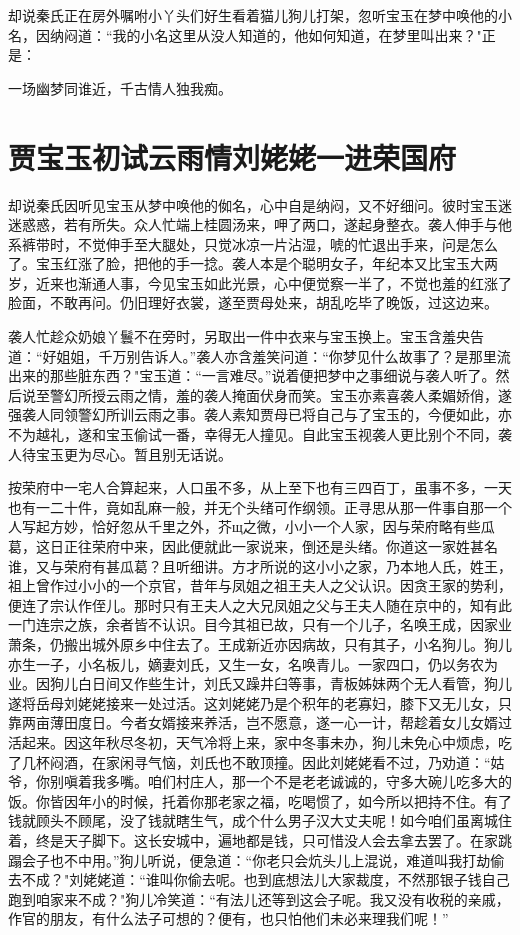 却说秦氏正在房外嘱咐小丫头们好生看着猫儿狗儿打架，忽听宝玉在梦中唤他的小名，因纳闷道：“我的小名这里从没人知道的，他如何知道，在梦里叫出来？"正是：

一场幽梦同谁近，千古情人独我痴。

\chapter{贾宝玉初试云雨情\ttlbreak 刘姥姥一进荣国府}

却说秦氏因听见宝玉从梦中唤他的侞名，心中自是纳闷，又不好细问。彼时宝玉迷迷惑惑，若有所失。众人忙端上桂圆汤来，呷了两口，遂起身整衣。袭人伸手与他系裤带时，不觉伸手至大腿处，只觉冰凉一片沾湿，唬的忙退出手来，问是怎么了。宝玉红涨了脸，把他的手一捻。袭人本是个聪明女子，年纪本又比宝玉大两岁，近来也渐通人事，今见宝玉如此光景，心中便觉察一半了，不觉也羞的红涨了脸面，不敢再问。仍旧理好衣裳，遂至贾母处来，胡乱吃毕了晚饭，过这边来。

袭人忙趁众奶娘丫鬟不在旁时，另取出一件中衣来与宝玉换上。宝玉含羞央告道：“好姐姐，千万别告诉人。”袭人亦含羞笑问道：“你梦见什么故事了？是那里流出来的那些脏东西？"宝玉道：“一言难尽。”说着便把梦中之事细说与袭人听了。然后说至警幻所授云雨之情，羞的袭人掩面伏身而笑。宝玉亦素喜袭人柔媚娇俏，遂强袭人同领警幻所训云雨之事。袭人素知贾母已将自己与了宝玉的，今便如此，亦不为越礼，遂和宝玉偷试一番，幸得无人撞见。自此宝玉视袭人更比别个不同，袭人待宝玉更为尽心。暂且别无话说。

按荣府中一宅人合算起来，人口虽不多，从上至下也有三四百丁，虽事不多，一天也有一二十件，竟如乱麻一般，并无个头绪可作纲领。正寻思从那一件事自那一个人写起方妙，恰好忽从千里之外，芥щ之微，小小一个人家，因与荣府略有些瓜葛，这日正往荣府中来，因此便就此一家说来，倒还是头绪。你道这一家姓甚名谁，又与荣府有甚瓜葛？且听细讲。方才所说的这小小之家，乃本地人氏，姓王，祖上曾作过小小的一个京官，昔年与凤姐之祖王夫人之父认识。因贪王家的势利，便连了宗认作侄儿。那时只有王夫人之大兄凤姐之父与王夫人随在京中的，知有此一门连宗之族，余者皆不认识。目今其祖已故，只有一个儿子，名唤王成，因家业萧条，仍搬出城外原乡中住去了。王成新近亦因病故，只有其子，小名狗儿。狗儿亦生一子，小名板儿，嫡妻刘氏，又生一女，名唤青儿。一家四口，仍以务农为业。因狗儿白日间又作些生计，刘氏又躁井臼等事，青板姊妹两个无人看管，狗儿遂将岳母刘姥姥接来一处过活。这刘姥姥乃是个积年的老寡妇，膝下又无儿女，只靠两亩薄田度日。今者女婿接来养活，岂不愿意，遂一心一计，帮趁着女儿女婿过活起来。因这年秋尽冬初，天气冷将上来，家中冬事未办，狗儿未免心中烦虑，吃了几杯闷酒，在家闲寻气恼，刘氏也不敢顶撞。因此刘姥姥看不过，乃劝道：“姑爷，你别嗔着我多嘴。咱们村庄人，那一个不是老老诚诚的，守多大碗儿吃多大的饭。你皆因年小的时候，托着你那老家之福，吃喝惯了，如今所以把持不住。有了钱就顾头不顾尾，没了钱就瞎生气，成个什么男子汉大丈夫呢！如今咱们虽离城住着，终是天子脚下。这长安城中，遍地都是钱，只可惜没人会去拿去罢了。在家跳蹋会子也不中用。”狗儿听说，便急道：“你老只会炕头儿上混说，难道叫我打劫偷去不成？"刘姥姥道：“谁叫你偷去呢。也到底想法儿大家裁度，不然那银子钱自己跑到咱家来不成？"狗儿冷笑道：“有法儿还等到这会子呢。我又没有收税的亲戚，作官的朋友，有什么法子可想的？便有，也只怕他们未必来理我们呢！”

